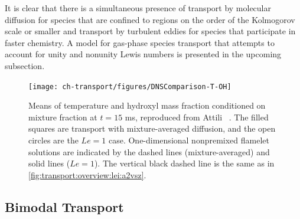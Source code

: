 It is clear that there is a simultaneous presence of transport by molecular diffusion for species that are confined to regions on the order of the Kolmogorov scale or smaller and transport by turbulent eddies for species that participate in faster chemistry. A model for gas-phase species transport that attempts to account for unity and nonunity Lewis numbers is presented in the upcoming subsection.

\begin{figure}[htb]
  \centering
  \texttt{[image: ch-transport/figures/DNSComparison-T-OH]}
  \caption[DNS Results with \texorpdfstring{$Le = 1$}{Le = 1} and \texorpdfstring{$Le \neq 1$}{Le != 1}, \texorpdfstring{$\langle T|Z \rangle$}{<T|Z>}, and \texorpdfstring{$\langle Y_{\ce{OH}}|Z \rangle$}{<YOH|Z>} vs. \texorpdfstring{$Z$}{Z}]{Means of temperature and hydroxyl mass fraction conditioned on mixture fraction at $t = 15$ ms, reproduced from Attili \etal~\cite{attili2016}. The filled squares are transport with mixture-averaged diffusion, and the open circles are the $Le = 1$ case. One-dimensional nonpremixed flamelet solutions are indicated by the dashed lines (mixture-averaged) and solid lines ($Le = 1$). The vertical black dashed line is the same as in \cref{fig:transport:overview:lei:a2vsz}.}
  \label{fig:transport:overview:lei:tvsz}
\end{figure}


\subsection{Bimodal Transport}
\label{sec:transport:overview:bimodal}

